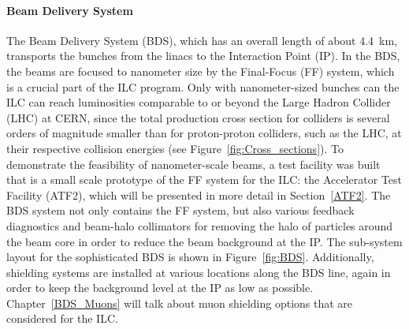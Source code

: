 \paragraph{Beam Delivery System}
The Beam Delivery System (BDS), which has an overall length of about \SI{4.4}{\kilo\meter}, transports the bunches from the linacs to the Interaction Point (IP).
In the BDS, the beams are focused to nanometer size by the Final-Focus (FF) system, which is a crucial part of the ILC program.
Only with nanometer-sized bunches can the ILC can reach luminosities comparable to or beyond the Large Hadron Collider (LHC) at CERN, since the total production cross section for \positron \electron colliders is several orders of magnitude smaller than for proton-proton colliders, such as the LHC, at their respective collision energies (see Figure~\ref{fig:Cross_sections}).
To demonstrate the feasibility of nanometer-scale beams, a test facility was built that is a small scale prototype of the FF system for the ILC: the Accelerator Test Facility (ATF2), which will be presented in more detail in Section~\ref{ATF2}.
The BDS system not only contains the FF system, but also various feedback diagnostics and beam-halo collimators for removing the halo of particles around the beam core in order to reduce the beam background at the IP. 
The sub-system layout for the sophisticated BDS is shown in Figure~\ref{fig:BDS}.
Additionally, shielding systems are installed at various locations along the BDS line, again in order to keep the background level at the IP as low as possible.
Chapter~\ref{BDS_Muons} will talk about muon shielding options that are considered for the ILC.

